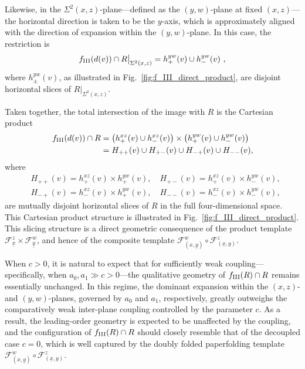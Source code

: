 \documentclass[12pt]{iopart}
\begin{document}
Likewise, in the \( \Sigma^2(x,z) \)-plane—defined as the \( (y,w) \)-plane at fixed \( (x,z) \)—the horizontal direction is taken to be the \( y \)-axis, which is approximately aligned with the direction of expansion within the \( (y,w) \)-plane. In this case, the restriction is
\[
f_{\rm III}(d(v)) \cap R \big|_{\Sigma^2(x,z)} = h^{yw}_{+}(v) \cup h^{yw}_{-}(v)\ ,
\]
where \( h^{yw}_{\pm}(v) \), as illustrated in Fig.~\ref{fig:f_III_direct_product}, are disjoint horizontal slices of \( R \big|_{\Sigma^2(x,z)} \).

Taken together, the total intersection of the image with \( R \) is the Cartesian product
\begin{eqnarray}
f_{\rm III}(d(v)) \cap R &= \left( h^{xz}_{+}(v) \cup h^{xz}_{-}(v) \right) \times \left( h^{yw}_{+}(v) \cup h^{yw}_{-}(v) \right)\nonumber \\
&=H_{++}(v)\cup H_{+-}(v)\cup H_{-+}(v)\cup H_{--}(v), \label{eq:f III four horizontal slices direct prodcut}
\end{eqnarray}
where
\begin{eqnarray}
&H_{++}(v) = h^{xz}_{+}(v)\times h^{yw}_{+}(v),\quad H_{+-}(v) = h^{xz}_{+}(v)\times h^{yw}_{-}(v),\nonumber\\
&H_{-+}(v) = h^{xz}_{-}(v)\times h^{yw}_{+}(v),\quad H_{--}(v) = h^{xz}_{-}(v)\times h^{yw}_{-}(v), \label{eq:f III four horizontal slices direct prodcut definition}
\end{eqnarray}
are mutually disjoint horizontal slices of \( R \) in the full four-dimensional space. This Cartesian product structure is illustrated in Fig.~\ref{fig:f_III_direct_product}. This slicing structure is a direct geometric consequence of the product template \( \mathcal{F}^z_{\underline{x}} \times \mathcal{F}^w_{\underline{y}} \), and hence of the composite template \( \mathcal{F}^w_{(x,\underline{y})} \circ \mathcal{F}^z_{(\underline{x},y)} \).

When \( c > 0 \), it is natural to expect that for sufficiently weak coupling—specifically, when \( a_0, a_1 \gg c > 0 \)—the qualitative geometry of \( f_{\rm III}(R) \cap R \) remains essentially unchanged. In this regime, the dominant expansion within the \( (x,z) \)- and \( (y,w) \)-planes, governed by \( a_0 \) and \( a_1 \), respectively, greatly outweighs the comparatively weak inter-plane coupling controlled by the parameter \( c \). As a result, the leading-order geometry is expected to be unaffected by the coupling, and the configuration of \( f_{\rm III}(R) \cap R \) should closely resemble that of the decoupled case \( c = 0 \), which is well captured by the doubly folded paperfolding template \( \mathcal{F}^w_{(x,\underline{y})} \circ \mathcal{F}^z_{(\underline{x},y)} \).
\end{document}
